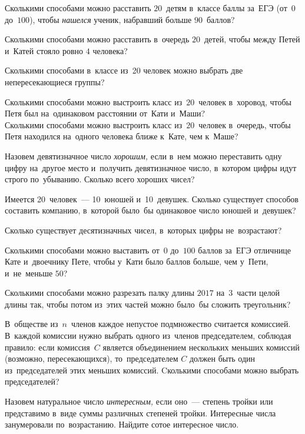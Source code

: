 


\begin{problems}

\item
Сколькими способами можно расставить $20$~детям в~классе баллы за~ЕГЭ
(от~$0$ до~$100$), чтобы \emph{нашелся} ученик, набравший больше $90$~баллов?

\item
Сколькими способами можно расставить в~очередь $20$~детей, чтобы между Петей
и~Катей стояло ровно $4$ человека?

\item
Сколькими способами в~классе из~20 человек можно выбрать две непересекающиеся
группы?

\item
\subproblem
Сколькими способами можно выстроить класс из~$20$~человек в~хоровод, чтобы Петя
был на~одинаковом расстоянии от~Кати и~Маши?
\\
\subproblem
Сколькими способами можно выстроить класс из~$20$~человек в~очередь, чтобы
Петя находился на~одного человека ближе к~Кате, чем к~Маше?

\item
Назовем девятизначное число \emph{хорошим,} если в~нем можно переставить одну
цифру на~другое место и~получить девятизначное число, в~котором цифры идут
строго по~убыванию.
Сколько всего хороших чисел?

\item
Имеется 20~человек~--- 10~юношей и~10~девушек.
Сколько существует способов составить компанию, в~которой было~бы одинаковое
число юношей и~девушек?

\item
Сколько существует десятизначных чисел, в~которых цифры не~возрастают?

\item
Сколькими способами можно выставить от~$0$ до~$100$ баллов за~ЕГЭ
отличнице Кате и~двоечнику Пете, чтобы у~Кати было баллов больше, чем у~Пети,
и~не~меньше $50$?

\item
Сколькими способами можно разрезать палку длины $2017$ на~$3$~части целой длины
так, чтобы потом из~этих частей можно было~бы сложить треугольник?

\item
В~обществе из~$n$~членов каждое непустое подмножество считается комиссией.
В~каждой комиссии нужно выбрать одного из~членов председателем, соблюдая
правило: если комиссия~$C$ является объединением нескольких меньших комиссий
(возможно, пересекающихся), то~председателем $C$ должен быть один
из~председателей этих меньших комиссий.
Cколькими способами можно выбрать председателей?

\item
Назовем натуральное число \emph{интересным,} если оно~--- степень тройки или
представимо в~виде суммы различных степеней тройки.
Интересные числа занумеровали по~возрастанию.
Найдите сотое интересное число.

\end{problems}


